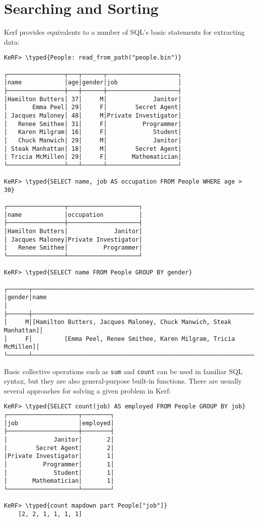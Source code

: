 \documentclass{article}
\newcommand{\typed}[1]{\textcolor{TealBlue}{#1}}
\newcommand{\pbreak}[0]{\vspace{0.5cm}}
\begin{document}
\pagebreak
\section{Searching and Sorting}

Kerf provides equivalents to a number of SQL's basic statements for extracting data:
\begin{Verbatim}
KeRF> \typed{People: read_from_path("people.bin")}

┌────────────────┬───┬──────┬────────────────────┐
│name            │age│gender│job                 │
├────────────────┼───┼──────┼────────────────────┤
│Hamilton Butters│ 37│     M│             Janitor│
│       Emma Peel│ 29│     F│        Secret Agent│
│ Jacques Maloney│ 48│     M│Private Investigator│
│   Renee Smithee│ 31│     F│          Programmer│
│   Karen Milgram│ 16│     F│             Student│
│   Chuck Manwich│ 29│     M│             Janitor│
│ Steak Manhattan│ 18│     M│        Secret Agent│
│ Tricia McMillen│ 29│     F│       Mathematician│
└────────────────┴───┴──────┴────────────────────┘

KeRF> \typed{SELECT name, job AS occupation FROM People WHERE age > 30}

┌────────────────┬────────────────────┐
│name            │occupation          │
├────────────────┼────────────────────┤
│Hamilton Butters│             Janitor│
│ Jacques Maloney│Private Investigator│
│   Renee Smithee│          Programmer│
└────────────────┴────────────────────┘

KeRF> \typed{SELECT name FROM People GROUP BY gender}

┌──────┬───────────────────────────────────────────────────────────────────┐
│gender│name                                                               │
├──────┼───────────────────────────────────────────────────────────────────┤
│     M│[Hamilton Butters, Jacques Maloney, Chuck Manwich, Steak Manhattan]│
│     F│         [Emma Peel, Renee Smithee, Karen Milgram, Tricia McMillen]│
└──────┴───────────────────────────────────────────────────────────────────┘
\end{Verbatim}

\pbreak

Basic collective operations such as \texttt{sum} and \texttt{count} can be used in familiar SQL syntax, but they are also general-purpose built-in functions. There are usually several approaches for solving a given problem in Kerf:
\begin{Verbatim}
KeRF> \typed{SELECT count(job) AS employed FROM People GROUP BY job}
┌────────────────────┬────────┐
│job                 │employed│
├────────────────────┼────────┤
│             Janitor│       2│
│        Secret Agent│       2│
│Private Investigator│       1│
│          Programmer│       1│
│             Student│       1│
│       Mathematician│       1│
└────────────────────┴────────┘

KeRF> \typed{count mapdown part People["job"]}
	[2, 2, 1, 1, 1, 1]
\end{Verbatim}
\end{document}
